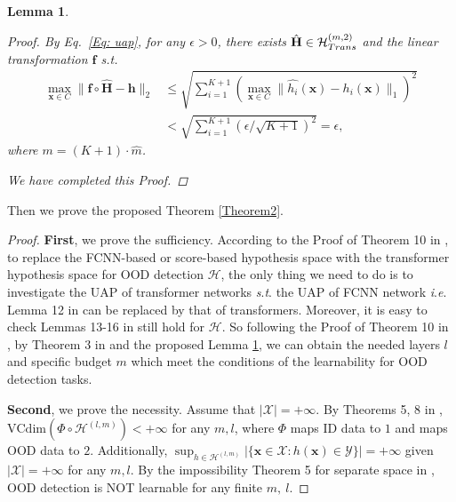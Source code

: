 \documentclass{article}
\theoremstyle{plain}
\newtheorem{lemma}[theorem]{Lemma}
\theoremstyle{definition}
\theoremstyle{remark}
\begin{document}
\begin{lemma}
\begin{proof}
        By Eq.~\eqref{Eq: uap}, for any $\epsilon>0$, there exists $\hat{\mathbf{H}} \in \mathcal{H}_{\rm Trans}^{(m,2)}$ and the linear transformation $\mathbf{f}$ \textit{s}.\textit{t}. 
        \begin{equation}
        \begin{aligned}
            \max_{\mathbf{x}\in C}\|\mathbf{f}\circ \hat{\mathbf{H}}-\mathbf{h}\|_2 &\leq \sqrt{\sum_{i=1}^{K+1}(\max_{\mathbf{x}\in C}\|\hat{h_i}(\mathbf{x})-h_i(\mathbf{x})\|_1)^2}\\
            &<\sqrt{\sum_{i=1}^{K+1}(\epsilon/\sqrt{K+1})^2}=\epsilon,
        \end{aligned}  
        \end{equation}
        where $m = (K+1)\cdot \hat{m}$.

        We have completed this Proof.
    \end{proof}
    \label{Lemma2}
\end{lemma}

Then we prove the proposed Theorem \ref{Theorem2}.

\begin{proof}
\textbf{First}, we prove the sufficiency. 
According to the Proof of Theorem 10 in \citet{fang2022out}, to replace the FCNN-based or score-based hypothesis space with the transformer hypothesis space for OOD detection $\mathcal{H}$, the only thing we need to do is to investigate the UAP of transformer networks \textit{s}.\textit{t}. the UAP of FCNN network \textit{i}.\textit{e}. Lemma 12 in \citet{fang2022out} can be replaced by that of transformers. Moreover, it is easy to check Lemmas 13-16 in \citet{fang2022out} still hold for $\mathcal{H}$.
So following the Proof of Theorem 10 in \citet{fang2022out}, by Theorem 3 in \citet{yun2019transformers} and the proposed Lemma \ref{Lemma2}, we can obtain the needed layers $l$ and specific budget $m$ which meet the conditions of the learnability for OOD detection tasks.

\textbf{Second}, we prove the necessity. 
Assume that $|\mathcal{X}|=+\infty$. By Theorems 5, 8 in \citet{bartlett2003vapnik}, $\text{VCdim}(\Phi \circ\mathcal{H}^{(l,m)})<+\infty$ for any $m,l$, where $\Phi$ maps ID data to $1$ and maps OOD data to $2$. Additionally, $\sup_{h\in \mathcal{H}^{(l,m)}}|\{\mathbf{x}\in \mathcal{X}:h(\mathbf{x})\in \mathcal{Y}\}|=+\infty$ given $|\mathcal{X}|=+\infty$ for any $m,l$. By the impossibility Theorem 5 for separate space in \citet{fang2022out}, OOD detection is NOT learnable for any finite $m,~l$.
\end{proof}
\end{document}
